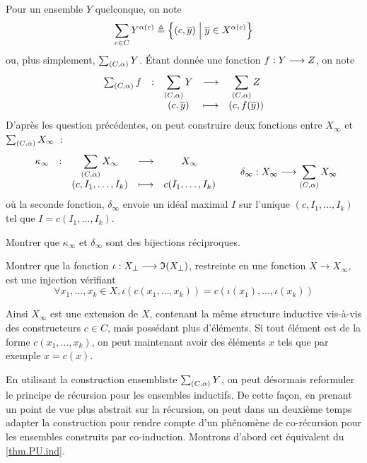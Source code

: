 \begin{problem}[La coinduction]
  Pour un ensemble $Y$ quelconque, on note
  \[\sum_{c \in C} Y^{\alpha(c)} \triangleq
  \left\{ (c,\overline{y}) \;\middle\vert\; \overline{y} \in X^{\alpha(c)} \right\}\]
  ou, plus simplement, $\sum_{(C,\alpha)} Y$. \'Etant donnée une fonction
  $f : \displaystyle Y \longrightarrow Z$, on note
  \[\makeFun{\sum_{(C,\arite)} f}{\sum_{(C,\arite)} Y}{\sum_{(C,\arite)} Z}
            {(c,\vec y)}{(c,f(\vec y))}\]
  D'après les question précédentes, on peut construire deux fonctions entre
  $X_\infty$ et $\sum_{(C,\alpha)} X_\infty$~:
  \[\makeFun{\kappa_\infty}{\sum_{(C,\arite)} X_\infty}{X_\infty}
            {(c,I_1,\ldots,I_k)}{c(I_1,\ldots,I_k)} \qquad
  \makeFunName{\delta_\infty}{X_\infty}{\sum_{(C,\arite)} X_\infty}\]
  où la seconde fonction, $\delta_\infty$ envoie un idéal maximal $I$ sur
  l'unique $(c,I_1,\ldots,I_k)$ tel que $I = c(I_1,\ldots,I_k)$.
  \begin{pbQuest}[resume]
  \item Montrer que $\kappa_\infty$ et $\delta_\infty$ sont des bijections
    réciproques.
  \item Montrer que la fonction $\iota : \displaystyle X_\bot \longrightarrow \mathfrak{I}(X_\bot)$,
    restreinte en une fonction $X \longrightarrow X_\infty$, est une injection
    vérifiant
    \[\forall x_1,\ldots,x_k \in X,
    \iota(c(x_1,\ldots,x_k)) = c(\iota(x_1),\ldots,\iota(x_k))\]
  \end{pbQuest}
  
  Ainsi $X_\infty$ est une extension de $X$, contenant la même structure
  inductive vis-à-vis des constructeurs $c\in C$, mais possédant plus
  d'éléments. Si tout élément est de la forme $c(x_1,\ldots,x_k)$, on peut
  maintenant avoir des éléments $x$ tels que par exemple $x = c(x)$.


  En utilisant la construction ensembliste $\sum_{(C,\alpha)} Y$, on peut
  désormais reformuler le principe de récursion pour les ensembles inductifs. De
  cette façon, en prenant un point de vue plus abstrait sur la récursion, on
  peut dans un deuxième temps adapter la construction pour rendre compte d'un
  phénomène de co-récursion pour les ensembles construits par co-induction.
  Montrons d'abord cet équivalent du \cref{thm.PU.ind}.


\end{problem}
